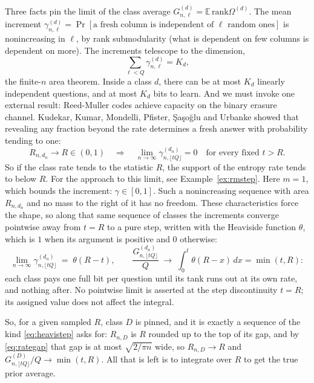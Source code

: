 \documentclass[11pt]{article}
\begin{document}
Three facts pin the limit of the class average
$G^{(d)}_{n,\ell} = \mathbb E\,\mathrm{rank} \Omega^{(d)}$. The mean increment
$\gamma^{(d)}_{n,\ell} = \Pr[\text{a fresh column is independent of }
\ell \text{ random ones}]$ is nonincreasing in $\ell$, by rank
submodularity (what is dependent on few columns is dependent on
more). The increments telescope to the dimension,
%
\begin{equation}
  \sum_{\ell < Q} \gamma^{(d)}_{n,\ell} = K_d,
\end{equation}
the finite-$n$ area theorem. Inside a class $d$, there can be at most $K_d$ linearly independent questions, and at most $K_d$ bits to learn. 
And we must invoke one external result:
Reed-Muller codes achieve capacity on the binary erasure channel.
Kudekar, Kumar, Mondelli, Pfister, \c Sa\c so\u glu and Urbanke
\cite{kkmpsu} showed that revealing any fraction beyond the rate
determines a fresh answer with probability tending to one:
%
\begin{equation}
  R_{n,d_n} \to R \in (0,1)
  \quad\Longrightarrow\quad
  \lim_{n\to\infty} \gamma^{(d_n)}_{n,\lfloor tQ\rfloor} = 0
  \quad\text{for every fixed } t > R .
  \label{eq:kkmpsu}
\end{equation}
%
So if the class rate tends to the statistic $R$, the support of the entropy rate tends to below $R$.
For the approach to this limit, see Example~\ref{ex:rmstep}.
Here $m = 1$, which bounds the increment: $\gamma \in [0,1]$.
Such a nonincreasing sequence with area $R_{n,d_n}$ and no mass to the
right of it has no freedom. These characteristics force the shape, so
along that same sequence of classes the increments converge pointwise
away from $t=R$ to a pure step, written with the Heaviside function $\theta$, which
is $1$ when its argument is positive and $0$ otherwise:
%
\begin{equation}
  \lim_{n\to\infty} \gamma^{(d_n)}_{n,\lfloor tQ\rfloor}
  \;=\; \theta(R - t),
  \qquad
  \frac{G^{(d_n)}_{n,\lfloor tQ\rfloor}}{Q}
  \;\longrightarrow\;
  \int_0^t \theta(R - x)\, dx = \min(t, R):
  \label{eq:heavistep}
\end{equation}
%
each class pays one full bit per question until its tank runs out at
its own rate, and nothing after. No pointwise limit is asserted at
the step discontinuity $t=R$; its assigned value does not affect the
integral.

So, for a given sampled $R$, class $D$ is pinned, and it is exactly a
sequence of the kind \eqref{eq:heavistep} asks for: $R_{n,D}$ is $R$
rounded up to the top of its gap, and by \eqref{eq:rategap} that gap is
at most $\sqrt{2/\pi n}$ wide, so $R_{n,D} \to R$ and
$G^{(D)}_{n,\lfloor tQ\rfloor}/Q \to \min(t,R)$. All that is left is to
integrate over $R$ to get the true prior average.
\end{document}
